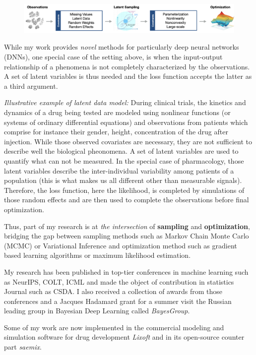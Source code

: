 \documentclass[twoside,11pt]{article}
\begin{document}
\begin{figure}[h]
\centering
\includegraphics[width=\textwidth]{fig}
\end{figure}

While my work provides \emph{novel} methods for particularly deep neural networks (DNNs), one special case of the setting above, is when the input-output relationship of a phenomena is not completely characterized by the observations.
A set of latent variables is thus needed and the loss function accepts the latter as a third argument.

\textit{ Illustrative example of latent data model:} 
During clinical trials, the kinetics and dynamics of a drug being tested are modeled using nonlinear functions (or systems of ordinary differential equations) and observations from patients which comprise for instance their gender, height, concentration of the drug after injection.
While those observed covariates are necessary, they are not sufficient to describe well the biological pheonomena. 
A set of latent variables are used to quantify what can not be measured. 
In the special case of pharmacology, those latent variables describe the inter-individual variability among patients of a population (this is what makes us all different other than measurable signals). 
Therefore, the loss function, here the likelihood, is completed by simulations of those random effects and are then used to complete the observations before final optimization.

Thus, part of my research is at \emph{the intersection} of \textbf{sampling} and \textbf{optimization}, bridging the gap between sampling methods such as Markov Chain Monte Carlo (MCMC) or Variational Inference and optimization method such as gradient based learning algorithms or maximum likelihood estimation.

My research has been published in top-tier conferences in machine learning such as NeurIPS, COLT, ICML and made the object of contribution in statistics Journal such as CSDA. I also received a collection of awards from those conferences and a Jacques Hadamard grant for a summer visit the Russian leading group in Bayesian Deep Learning called \emph{BayesGroup}.

Some of my work are now implemented in the commercial modeling and simulation software for drug development \emph{Lixoft} and in its open-source counter part \emph{saemix}.
\end{document}
